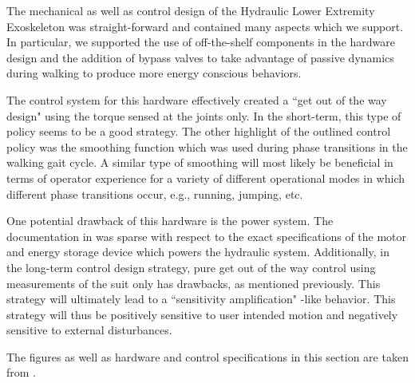 \begin{refsection}
The mechanical as well as control design of the Hydraulic Lower Extremity Exoskeleton was straight-forward and contained many aspects which we support.  In particular, we supported the use of off-the-shelf components in the hardware design and the addition of bypass valves to take advantage of passive dynamics during walking to produce more energy conscious behaviors.    

The control system for this hardware effectively created a ``get out of the way design" using the torque sensed at the joints only.  In the short-term, this type of policy seems to be a good strategy.  The other highlight of the outlined control policy was the smoothing function which was used during phase transitions in the walking gait cycle.  A similar type of smoothing will most likely be beneficial in terms of operator experience for a variety of different operational modes in which different phase transitions occur, e.g., running, jumping, etc.

One potential drawback of this hardware is the power system.  The documentation in \cite{dual_mode_2015} was sparse with respect to the exact specifications of the motor and energy storage device which powers the hydraulic system.  Additionally, in the long-term control design strategy, pure get out of the way control using measurements of the suit only has drawbacks, as mentioned previously.  This strategy will ultimately lead to a ``sensitivity amplification" -like behavior.  This strategy will thus be positively sensitive to user intended motion and negatively sensitive to external disturbances.  
 
The figures as well as hardware and control specifications in this section are taken from \cite{dual_mode_2015}.
 
\printbibliography[heading=subbibliography]

\end{refsection}

 

 
 
 
 

